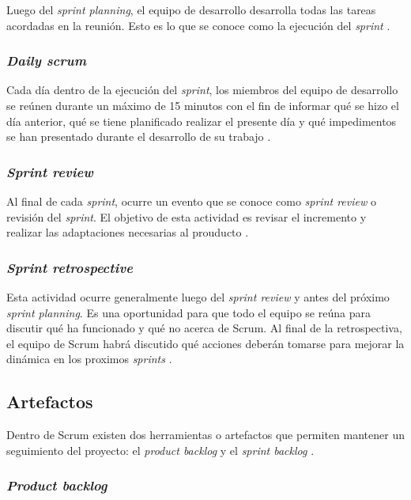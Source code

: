 Luego del \textit{sprint planning}, el equipo de desarrollo desarrolla todas las tareas acordadas en la reunión. Esto es lo que se conoce como la ejecución del \textit{sprint} \cite{SCRM12}.

\subsubsection{\textit{Daily scrum}}

Cada día dentro de la ejecución del \textit{sprint}, los miembros del equipo de desarrollo se reúnen durante un máximo de 15 minutos con el fin de informar qué se hizo el día anterior, qué se tiene planificado realizar el presente día y qué impedimentos se han presentado durante el desarrollo de su trabajo \cite{SCRM12}.

\subsubsection{\textit{Sprint review}}

Al final de cada \textit{sprint}, ocurre un evento que se conoce como \textit{sprint review} o revisión del \textit{sprint}. El objetivo de esta actividad es revisar el incremento y realizar las adaptaciones necesarias al prouducto \cite{SCRM12}.

\subsubsection{\textit{Sprint retrospective}}

Esta actividad ocurre generalmente luego del \textit{sprint review} y antes del próximo \textit{sprint planning}. Es una oportunidad para que todo el equipo se reúna para discutir qué ha funcionado y qué no acerca de Scrum. Al final de la retrospectiva, el equipo de Scrum habrá discutido qué acciones deberán tomarse para mejorar la dinámica en los proximos \textit{sprints} \cite{SCRM2}. 

\subsection{Artefactos}

Dentro de Scrum existen dos herramientas o artefactos que permiten mantener un seguimiento del proyecto: el \textit{product backlog} y el \textit{sprint backlog} \cite{SCRM2}.

\subsubsection{\textit{Product backlog}}

